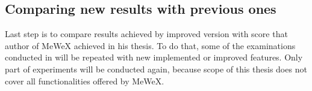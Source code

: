 \subsection{Comparing new results with previous ones}
Last step is to compare results achieved by improved version with score that author of MeWeX achieved in his thesis.
To do that, some of the examinations conducted in \cite{mgr} will be repeated with new implemented or improved features. 
Only part of experiments will be conducted again, because scope of this thesis does not cover all functionalities offered by MeWeX.